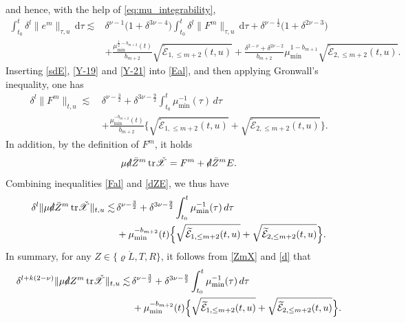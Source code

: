 \documentclass[11pt,twoside]{article}
\begin{document}
and hence, with the help of \eqref{eq:mu_integrability},
\begin{equation}\label{Y-21}
\begin{split}
\int_{t_0}^t \delta^l \|e^m\|_{\tau,u} \,\mathrm{d}\tau
\lesssim &\delta^{\nu-1} \bigl(1 + \delta^{3\nu-4}\bigr) \int_{t_0}^t \delta^l \|F^m\|_{\tau,u} \,\mathrm{d}\tau
+ \delta^{\nu-\frac{1}{2}} \bigl(1 + \delta^{2\nu-3}\bigr) \\
& + \frac{\mu_{\min}^{\frac{1}{2} - b_{m+2}}(t)}{b_{m+2}} \sqrt{\widetilde{\mathcal{E}}_{1,\leq m+2}(t,u)} + \frac{\delta^{2-\nu} + \delta^{2\nu-2}}{b_{m+2}} \mu_{\min}^{1 - b_{m+1}} \sqrt{\widetilde{\mathcal{E}}_{2,\leq m+2}(t,u)}.
\end{split}
\end{equation}
Inserting \eqref{sdE}, \eqref{Y-19} and \eqref{Y-21} into \eqref{Eal}, and then applying Gronwall's inequality, one has
\begin{equation}\label{Fal}
\begin{split}
\delta^l \| F^m \|_{t,u} \lesssim \,&\delta^{\nu - \frac{3}{2}} + \delta^{3\nu - \frac{9}{2}} \int_{t_0}^t \mu_{\min}^{-1}(\tau) \, d\tau \\
&+ \frac{\mu_{\min}^{-b_{m+2}}(t)}{b_{m+2}} \Big\{ \sqrt{\widetilde{\mathcal{E}}_{1,\leq m+2}(t,u)} + \sqrt{\widetilde{\mathcal{E}}_{2,\leq m+2}(t,u)} \Big\}.
\end{split}
\end{equation}
In addition, by the definition of $F^m$, it holds
\[
\mu \slashed{d} \bar{Z}^m \, \mathrm{tr}\check{\mathscr{X}} = F^m + \slashed{d} \bar{Z}^m E.
\]
Combining inequalities \eqref{Fal} and \eqref{dZE}, we thus have
\begin{equation}\label{d}
\begin{split}
\delta^l \| \mu \slashed{d} \bar{Z}^m \, \mathrm{tr}\check{\mathscr{X}} \|_{t,u} \lesssim \,&\delta^{\nu - \frac{3}{2}} + \delta^{3\nu - \frac{9}{2}} \int_{t_0}^t \mu_{\min}^{-1}(\tau) \, d\tau \\
&+ \mu_{\min}^{-b_{m+2}}(t)\Big\{ \sqrt{\widetilde{\mathcal{E}}_{1,\leq m+2}(t,u)} + \sqrt{\widetilde{\mathcal{E}}_{2,\leq m+2}(t,u)} \Big\}.
\end{split}
\end{equation}
In summary, for any $Z\in\{\varrho\mathring L, T, R\}$, it follows from \eqref{ZmX} and \eqref{d} that
\begin{equation}\label{dnnchi}
\begin{split}
\delta^{l+k(2-\nu)} \| \mu \slashed{d}{Z}^m \, \mathrm{tr}\check{\mathscr{X}} \|_{t,u} \lesssim \,&\delta^{\nu - \frac{3}{2}} + \delta^{3\nu - \frac{9}{2}} \int_{t_0}^t \mu_{\min}^{-1}(\tau) \, d\tau \\
&+ \mu_{\min}^{-b_{m+2}}(t) \Big\{ \sqrt{\widetilde{\mathcal{E}}_{1,\leq m+2}(t,u)} + \sqrt{\widetilde{\mathcal{E}}_{2,\leq m+2}(t,u)} \Big\}.
\end{split}
\end{equation}
\end{document}
